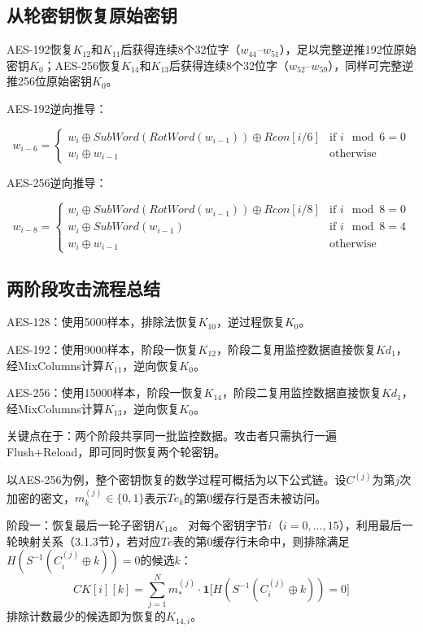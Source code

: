 \subsection{从轮密钥恢复原始密钥}

AES-192恢复$K_{12}$和$K_{11}$后获得连续8个32位字（$w_{44}$--$w_{51}$），足以完整逆推192位原始密钥$K_0$；AES-256恢复$K_{14}$和$K_{13}$后获得连续8个32位字（$w_{52}$--$w_{59}$），同样可完整逆推256位原始密钥$K_0$。

AES-192逆向推导：

\begin{equation}
w_{i-6} = \begin{cases} w_i \oplus SubWord(RotWord(w_{i-1})) \oplus Rcon[i/6] & \text{if } i \mod 6 = 0 \\ w_i \oplus w_{i-1} & \text{otherwise} \end{cases}
\end{equation}

AES-256逆向推导：

\begin{equation}
w_{i-8} = \begin{cases} w_i \oplus SubWord(RotWord(w_{i-1})) \oplus Rcon[i/8] & \text{if } i \mod 8 = 0 \\ w_i \oplus SubWord(w_{i-1}) & \text{if } i \mod 8 = 4 \\ w_i \oplus w_{i-1} & \text{otherwise} \end{cases}
\end{equation}

\subsection{两阶段攻击流程总结}

AES-128：使用5000样本，排除法恢复$K_{10}$，逆过程恢复$K_0$。

AES-192：使用9000样本，阶段一恢复$K_{12}$，阶段二复用监控数据直接恢复$Kd_1$，经MixColumns计算$K_{11}$，逆向恢复$K_0$。

AES-256：使用15000样本，阶段一恢复$K_{14}$，阶段二复用监控数据直接恢复$Kd_1$，经MixColumns计算$K_{13}$，逆向恢复$K_0$。

关键点在于：两个阶段共享同一批监控数据。攻击者只需执行一遍Flush+Reload，即可同时恢复两个轮密钥。

以AES-256为例，整个密钥恢复的数学过程可概括为以下公式链。设$C^{(j)}$为第$j$次加密的密文，$m_{k}^{(j)} \in \{0,1\}$表示$Te_k$的第0缓存行是否未被访问。

阶段一：恢复最后一轮子密钥$K_{14}$。
对每个密钥字节$i$（$i = 0,\dots,15$），利用最后一轮映射关系（3.1.3节），若对应$Te$表的第0缓存行未命中，则排除满足$H(S^{-1}(C_i^{(j)} \oplus k)) = 0$的候选$k$：
\begin{equation}
CK[i][k] = \sum_{j=1}^{N} m_{*}^{(j)} \cdot \mathbf{1}\bigl[H(S^{-1}(C_i^{(j)} \oplus k)) = 0\bigr]
\end{equation}
排除计数最少的候选即为恢复的$K_{14,i}$。

